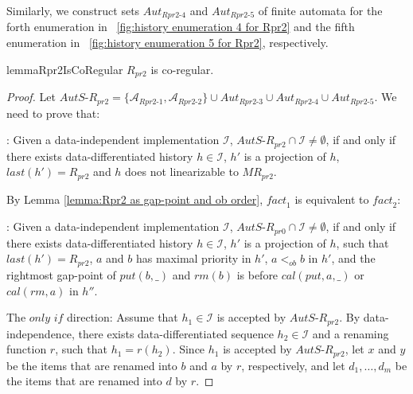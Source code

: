Similarly, we construct sets $\textit{Aut}_{\textit{Rpr2-4}}$ and $\textit{Aut}_{\textit{Rpr2-5}}$ of finite automata for the forth enumeration in \figurename~\ref{fig:history enumeration 4 for Rpr2} and the fifth enumeration in \figurename~\ref{fig:history enumeration 5 for Rpr2}, respectively.


\begin{restatable}{lemma}{Rpr2IsCoRegular}
\label{lemma:Rpr2 is co-regular}
$R_{\textit{pr2}}$ is co-regular.
\end{restatable}

\begin {proof}

Let $\textit{AutS-R}_{\textit{pr2}} = \{ \mathcal{A}_{\textit{Rpr2-1}}, \mathcal{A}_{\textit{Rpr2-2}} \} \cup \textit{Aut}_{\textit{Rpr2-3}} \cup \textit{Aut}_{\textit{Rpr2-4}} \cup \textit{Aut}_{\textit{Rpr2-5}}$. We need to prove that:

: Given a data-independent implementation $\mathcal{I}$, $\textit{AutS-R}_{\textit{pr2}} \cap \mathcal{I} \neq \emptyset$, if and only if there exists data-differentiated history $h \in \mathcal{I}$, $h'$ is a projection of $h$, $\textit{last}(h') = R_{\textit{pr2}}$ and $h$ does not linearizable to $\textit{MR}_{\textit{pr2}}$.

By Lemma \ref{lemma:Rpr2 as gap-point and ob order}, $\textit{fact}_1$ is equivalent to $\textit{fact}_2$:

: Given a data-independent implementation $\mathcal{I}$, $\textit{AutS-R}_{\textit{pr0}} \cap \mathcal{I} \neq \emptyset$, if and only if there exists data-differentiated history $h \in \mathcal{I}$, $h'$ is a projection of $h$, such that $\textit{last}(h') = R_{\textit{pr2}}$, $a$ and $b$ has maximal priority in $h'$, $a <_{\textit{ob}} b$ in $h'$, and the rightmost gap-point of $\textit{put}(b,\_)$ and $\textit{rm}(b)$ is before $\textit{cal}(\textit{put},a,\_)$ or $\textit{cal}(\textit{rm},a)$ in $h''$.

\noindent The $\textit{only if}$ direction: Assume that $h_1 \in \mathcal{I}$ is accepted by $\textit{AutS-R}_{\textit{pr2}}$. By data-independence, there exists data-differentiated sequence $h_2 \in \mathcal{I}$ and a renaming function $r$, such that $h_1=r(h_2)$. Since $h_1$ is accepted by $\textit{AutS-R}_{\textit{pr2}}$, let $x$ and $y$ be the items that are renamed into $b$ and $a$ by $r$, respectively, and let $d_1,\ldots,d_m$ be the items that are renamed into $d$ by $r$.


\end{proof}
